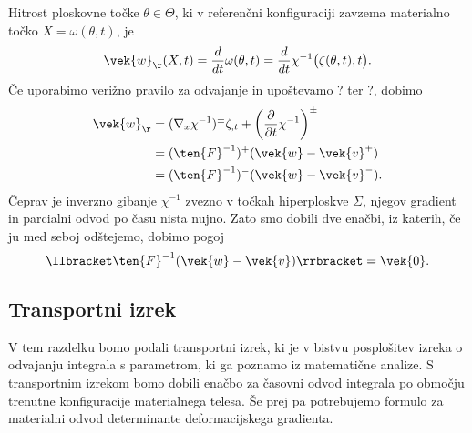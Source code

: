 Hitrost ploskovne točke $\theta\in\Theta$, ki v referenčni konfiguraciji zavzema materialno točko
$X=\omega(\theta,t)$, je
\[
	\vek{w}_{\r}(X,t)=\frac{d}{dt}\omega(\theta, t)=\frac{d}{dt}\chi^{-1}\big(\zeta(\theta,t),t\big).
\]
Če uporabimo verižno pravilo za odvajanje in upoštevamo ? ter ?, dobimo
\begin{align}
	\vek{w}_{\r}&=(\nabla_{x}\chi^{-1})^{\pm}\zeta_{,t}+\left(\frac{\partial}{\partial t}\chi^{-1}\right)^{\pm} \nonumber \\
	&=(\ten{F}^{-1})^+(\vek{w}-\vek{v}^+) \label{e:w} \\
	&=(\ten{F}^{-1})^-(\vek{w}-\vek{v}^-). \nonumber
\end{align}
Čeprav je inverzno gibanje $\chi^{-1}$ zvezno v točkah hiperploskve $\Sigma$, njegov gradient in
parcialni odvod po času nista nujno. Zato smo dobili dve enačbi, iz katerih, če ju med seboj odštejemo, dobimo pogoj
\[ \llbracket \ten{F}^{-1}(\vek{w}-\vek{v}) \rrbracket = \vek{0}. \]


\subsection{Transportni izrek}


V tem razdelku bomo podali transportni izrek, ki je v bistvu posplošitev izreka o odvajanju
integrala s parametrom, ki ga poznamo iz matematične analize. S transportnim izrekom
bomo dobili enačbo za časovni odvod integrala po območju trenutne konfiguracije materialnega telesa.
Še prej pa potrebujemo formulo za materialni odvod determinante deformacijskega gradienta.

